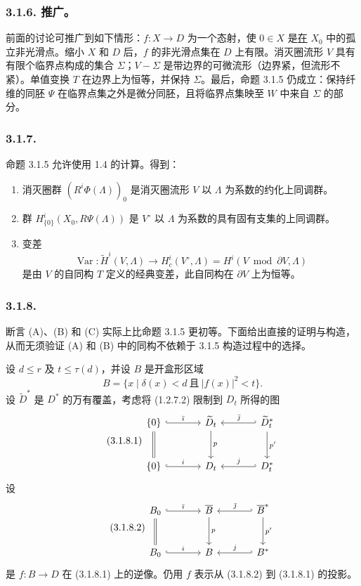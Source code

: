 \subsubsection*{3.1.6. 推广。}
前面的讨论可推广到如下情形：$f:X\to D$ 为一个态射，使 $0\in X$ 是\underline{在} $X_0$ 中的孤立非光滑点。缩小 $X$ 和 $D$ 后，$f$ 的非光滑点集在 $D$ 上有限。消灭圈流形 $V$ 具有有限个临界点构成的集合 $\Sigma$；$V-\Sigma$ 是带边界的可微流形（边界紧，但流形不紧）。单值变换 $T$ 在边界上为恒等，并保持 $\Sigma$。最后，命题 3.1.5 仍成立：保持纤维的同胚 $\Psi$ 在临界点集之外是微分同胚，且将临界点集映至 $W$ 中来自 $\Sigma$ 的部分。

\subsubsection*{3.1.7.}
命题 3.1.5 允许使用 1.4 的计算。得到：

\begin{enumerate}[label=(\Alph*)]
\item 消灭圈群 $(R^i\Phi(\Lambda))_0$ 是消灭圈流形 $V$ 以 $\Lambda$ 为系数的约化上同调群。
\item 群 $H^i_{\{0\}}(X_0,R\Psi(\Lambda))$ 是 $V^\circ$ 以 $\Lambda$ 为系数的具有固有支集的上同调群。
\item 变差
\[
  \operatorname{Var}:\widetilde H^i(V,\Lambda)
  \longrightarrow H_c^i(V^\circ,\Lambda)
  =H^i(V\bmod\partial V,\Lambda)
  \]
是由 $V$ 的自同构 $T$ 定义的经典变差，此自同构在 $\partial V$ 上为恒等。
\end{enumerate}

\subsubsection*{3.1.8.}
断言 (A)、(B) 和 (C) 实际上比命题 3.1.5 更初等。下面给出直接的证明与构造，从而无须验证 (A) 和 (B) 中的同构不依赖于 3.1.5 构造过程中的选择。

设 $d\leq r$ 及 $t\leq\tau(d)$，并设 $B$ 是开盒形区域
\[
B=\{x\mid\delta(x)<d\ \text{且}\ |f(x)|^2<t\}.
\]
设 $\widetilde D^*$ 是 $D^*$ 的万有覆盖，考虑将 (1.2.7.2) 限制到 $D_t$ 所得的图
\begin{equation}\tag{3.1.8.1}
\begin{tikzcd}[column sep=large,row sep=large]
\{0\} \arrow[r,hook,"\bar\imath"] \arrow[d,equal]
  & \widetilde D_t \arrow[d,"p"]
  & \widetilde D_t^* \arrow[l,hook',"\bar\jmath"'] \arrow[d,"p'"] \\
\{0\} \arrow[r,hook,"i"]
  & D_t
  & D_t^* \arrow[l,hook',"j"']
\end{tikzcd}
\end{equation}
设
\begin{equation}\tag{3.1.8.2}
\begin{tikzcd}[column sep=large,row sep=large]
B_0 \arrow[r,hook,"\bar\imath"] \arrow[d,equal]
  & \overline B \arrow[d,"p"]
  & \overline B^* \arrow[l,hook',"\bar\jmath"'] \arrow[d,"p'"] \\
B_0 \arrow[r,hook,"i"]
  & B
  & B^* \arrow[l,hook',"j"']
\end{tikzcd}
\end{equation}
是 $f:B\to D$ 在 (3.1.8.1) 上的逆像。仍用 $f$ 表示从 (3.1.8.2) 到 (3.1.8.1) 的投影。

